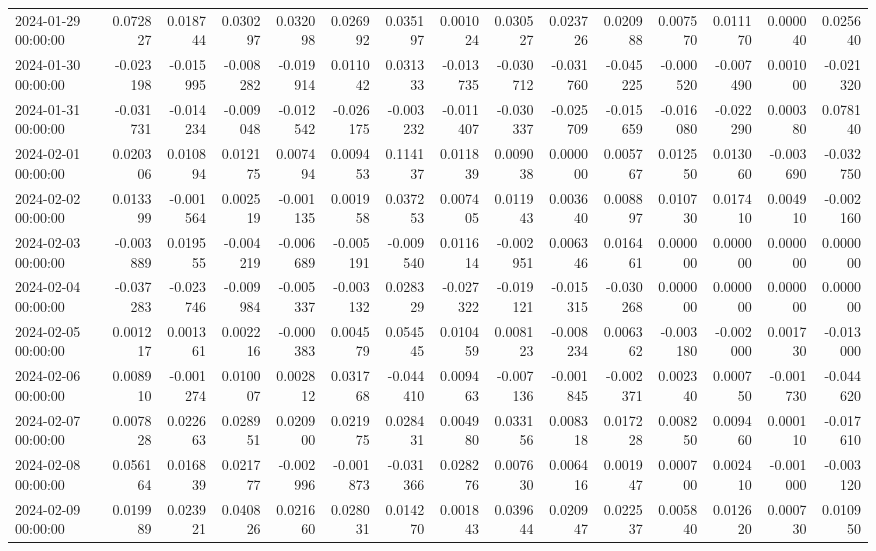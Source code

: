 \begin{tabular}{lrrrrrrrrrrrrrr}
2024-01-29 00:00:00 & 0.072827 & 0.018744 & 0.030297 & 0.032098 & 0.026992 & 0.035197 & 0.001024 & 0.030527 & 0.023726 & 0.020988 & 0.007570 & 0.011170 & 0.000040 & 0.025640 \\
2024-01-30 00:00:00 & -0.023198 & -0.015995 & -0.008282 & -0.019914 & 0.011042 & 0.031333 & -0.013735 & -0.030712 & -0.031760 & -0.045225 & -0.000520 & -0.007490 & 0.001000 & -0.021320 \\
2024-01-31 00:00:00 & -0.031731 & -0.014234 & -0.009048 & -0.012542 & -0.026175 & -0.003232 & -0.011407 & -0.030337 & -0.025709 & -0.015659 & -0.016080 & -0.022290 & 0.000380 & 0.078140 \\
2024-02-01 00:00:00 & 0.020306 & 0.010894 & 0.012175 & 0.007494 & 0.009453 & 0.114137 & 0.011839 & 0.009038 & 0.000000 & 0.005767 & 0.012550 & 0.013060 & -0.003690 & -0.032750 \\
2024-02-02 00:00:00 & 0.013399 & -0.001564 & 0.002519 & -0.001135 & 0.001958 & 0.037253 & 0.007405 & 0.011943 & 0.003640 & 0.008897 & 0.010730 & 0.017410 & 0.004910 & -0.002160 \\
2024-02-03 00:00:00 & -0.003889 & 0.019555 & -0.004219 & -0.006689 & -0.005191 & -0.009540 & 0.011614 & -0.002951 & 0.006346 & 0.016461 & 0.000000 & 0.000000 & 0.000000 & 0.000000 \\
2024-02-04 00:00:00 & -0.037283 & -0.023746 & -0.009984 & -0.005337 & -0.003132 & 0.028329 & -0.027322 & -0.019121 & -0.015315 & -0.030268 & 0.000000 & 0.000000 & 0.000000 & 0.000000 \\
2024-02-05 00:00:00 & 0.001217 & 0.001361 & 0.002216 & -0.000383 & 0.004579 & 0.054545 & 0.010459 & 0.008123 & -0.008234 & 0.006362 & -0.003180 & -0.002000 & 0.001730 & -0.013000 \\
2024-02-06 00:00:00 & 0.008910 & -0.001274 & 0.010007 & 0.002812 & 0.031768 & -0.044410 & 0.009463 & -0.007136 & -0.001845 & -0.002371 & 0.002340 & 0.000750 & -0.001730 & -0.044620 \\
2024-02-07 00:00:00 & 0.007828 & 0.022663 & 0.028951 & 0.020900 & 0.021975 & 0.028431 & 0.004980 & 0.033156 & 0.008318 & 0.017228 & 0.008250 & 0.009460 & 0.000110 & -0.017610 \\
2024-02-08 00:00:00 & 0.056164 & 0.016839 & 0.021777 & -0.002996 & -0.001873 & -0.031366 & 0.028276 & 0.007630 & 0.006416 & 0.001947 & 0.000700 & 0.002410 & -0.001000 & -0.003120 \\
2024-02-09 00:00:00 & 0.019989 & 0.023921 & 0.040826 & 0.021660 & 0.028031 & 0.014270 & 0.001843 & 0.039644 & 0.020947 & 0.022537 & 0.005840 & 0.012620 & 0.000730 & 0.010950 \\

\end{tabular}
